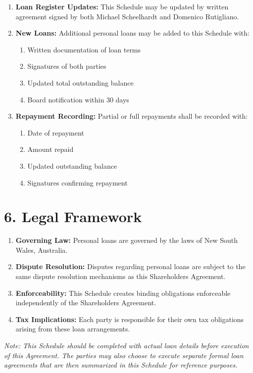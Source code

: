 \begin{enumerate}[label=\arabic*.]
\item \textbf{Loan Register Updates:} This Schedule may be updated by written agreement signed by both Michael Scheelhardt and Domenico Rutigliano.

\item \textbf{New Loans:} Additional personal loans may be added to this Schedule with:
    \begin{enumerate}[label=(\alph*)]
    \item Written documentation of loan terms
    \item Signatures of both parties
    \item Updated total outstanding balance
    \item Board notification within 30 days
    \end{enumerate}

\item \textbf{Repayment Recording:} Partial or full repayments shall be recorded with:
    \begin{enumerate}[label=(\alph*)]
    \item Date of repayment
    \item Amount repaid
    \item Updated outstanding balance
    \item Signatures confirming repayment
    \end{enumerate}
\end{enumerate}

\section*{6. Legal Framework}

\begin{enumerate}[label=\arabic*.]
\item \textbf{Governing Law:} Personal loans are governed by the laws of New South Wales, Australia.

\item \textbf{Dispute Resolution:} Disputes regarding personal loans are subject to the same dispute resolution mechanisms as this Shareholders Agreement.

\item \textbf{Enforceability:} This Schedule creates binding obligations enforceable independently of the Shareholders Agreement.

\item \textbf{Tax Implications:} Each party is responsible for their own tax obligations arising from these loan arrangements.
\end{enumerate}

\textit{Note: This Schedule should be completed with actual loan details before execution of this Agreement. The parties may also choose to execute separate formal loan agreements that are then summarized in this Schedule for reference purposes.} 